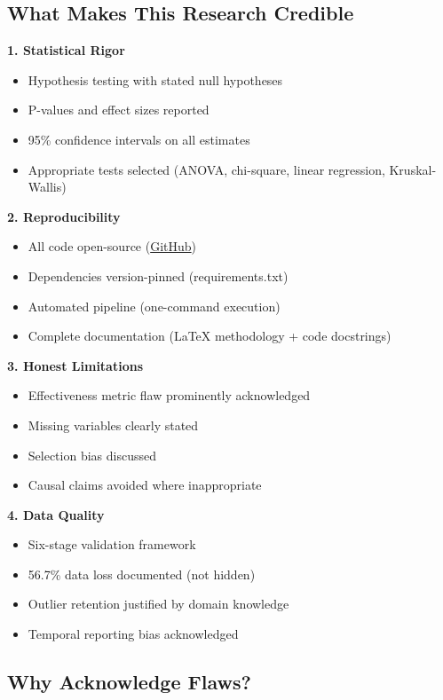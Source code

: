 \documentclass[11pt,a4paper]{article}
\begin{document}
\subsection{What Makes This Research Credible}

\textbf{1. Statistical Rigor}
\begin{itemize}
    \item Hypothesis testing with stated null hypotheses
    \item P-values and effect sizes reported
    \item 95\% confidence intervals on all estimates
    \item Appropriate tests selected (ANOVA, chi-square, linear regression, Kruskal-Wallis)
\end{itemize}

\textbf{2. Reproducibility}
\begin{itemize}
    \item All code open-source (\href{https://github.com/ngrief/FireAnalyst}{GitHub})
    \item Dependencies version-pinned (requirements.txt)
    \item Automated pipeline (one-command execution)
    \item Complete documentation (LaTeX methodology + code docstrings)
\end{itemize}

\textbf{3. Honest Limitations}
\begin{itemize}
    \item Effectiveness metric flaw prominently acknowledged
    \item Missing variables clearly stated
    \item Selection bias discussed
    \item Causal claims avoided where inappropriate
\end{itemize}

\textbf{4. Data Quality}
\begin{itemize}
    \item Six-stage validation framework
    \item 56.7\% data loss documented (not hidden)
    \item Outlier retention justified by domain knowledge
    \item Temporal reporting bias acknowledged
\end{itemize}

\subsection{Why Acknowledge Flaws?}
\end{document}
